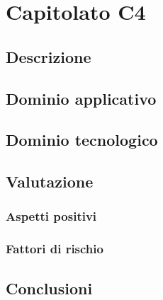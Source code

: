 \documentclass[../StudioDiFattibilita.tex]{subfiles}
\begin{document}
	\section{Capitolato C4}
		\subsection{Descrizione}
		\subsection{Dominio applicativo}
		\subsection{Dominio tecnologico}
		\subsection{Valutazione}
			\subsubsection{Aspetti positivi}
			\subsubsection{Fattori di rischio}
			\subsection{Conclusioni}
\end{document}
